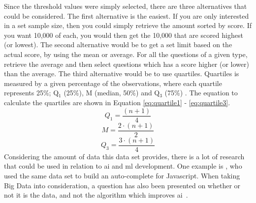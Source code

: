 Since the threshold values were simply selected, there are three alternatives that could be considered.
The first alternative is the easiest. 
If you are only interested in a set sample size, then you could simply retrieve the amount sorted by score.
If you want 10,000 of each, you would then get the 10,000 that are scored highest (or lowest).
The second alternative would be to get a set limit based on the actual score, by using the mean or average.
For all the questions of a given type, retrieve the average and then select questions which has a score higher (or lower) than the average.
The third alternative would be to use quartiles. 
Quartiles is measured by a given percentage of the observations, where each quartile represents 25\%; 
Q$_{1}$ (25\%), M (median, 50\%) and Q$_{3}$ (75\%) \cite{Hagen2011}.
The equation to calculate the quartiles are shown in Equation \ref{eq:quartile1} - \ref{eq:quartile3}.
\begin{equation}\label{eq:quartile1}
Q_{1} = \frac{(n + 1)}{4}
\end{equation}
\begin{equation}\label{eq:quartile2}
M = \frac{2 \cdot (n + 1)}{2}
\end{equation}
\begin{equation}\label{eq:quartile3}
Q_{3} = \frac{3 \cdot (n + 1)}{4}
\end{equation}
\clearpage\noindent
Considering the amount of data this data set provides, there is a lot of research that could be used in relation to \gls{ai} and \gls{ml} development. 
One example is \textcite{Schutte2016}, who used the same data set to build an auto-complete for Javascript. 
When taking Big Data into consideration, a question has also been presented on whether or not it is the data, and not the algorithm which improves \gls{ai}~\cite{Klein2016,SpaceMachine.net2016,Wissner-Gross2016}.

